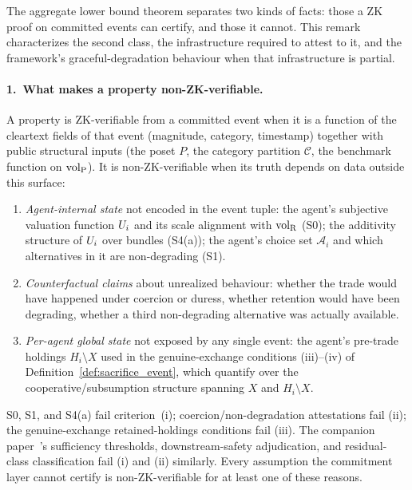 \begin{remark}
\label{rem:external_attestation}
The aggregate lower bound theorem separates two kinds of facts:
those a ZK proof on committed events can certify, and those it
cannot.  This remark characterizes the second class, the
infrastructure required to attest to it, and the framework's
graceful-degradation behaviour when that infrastructure is
partial.

\paragraph{1.~What makes a property non-ZK-verifiable.}
A property is ZK-verifiable from a committed event when it is
a function of the cleartext fields of that event (magnitude,
category, timestamp) together with public structural inputs
(the poset $P$, the category partition $\mathcal{C}$, the
benchmark function on ${\operatorname{vol}_{\mathrm{P}}}$).  It is non-ZK-verifiable when
its truth depends on data outside this surface:
\begin{enumerate}
\item[(i)] \emph{Agent-internal state} not encoded in the event
  tuple: the agent's subjective valuation function $U_i$ and
  its scale alignment with ${\operatorname{vol}_{\mathrm{R}}}$ (S0); the additivity
  structure of $U_i$ over bundles (S4(a)); the agent's choice
  set $\mathcal{A}_i$ and which alternatives in it are
  non-degrading (S1).
\item[(ii)] \emph{Counterfactual claims} about unrealized
  behaviour: whether the trade would have happened under
  coercion or duress, whether retention would have been
  degrading, whether a third non-degrading alternative was
  actually available.
\item[(iii)] \emph{Per-agent global state} not exposed by
  any single event: the agent's pre-trade holdings
  $H_i \setminus X$ used in the genuine-exchange conditions
  (iii)--(iv) of Definition~\ref{def:sacrifice_event}, which
  quantify over the cooperative/subsumption structure spanning
  $X$ and $H_i \setminus X$.
\end{enumerate}
S0, S1, and S4(a) fail criterion~(i); coercion/non-degradation
attestations fail (ii); the genuine-exchange retained-holdings
conditions fail (iii).  The companion
paper~\citep[Need~Sufficiency]{lasser2026paper8b}'s
sufficiency thresholds, downstream-safety adjudication, and
residual-class classification fail (i) and (ii) similarly.
Every assumption the commitment layer cannot certify is
non-ZK-verifiable for at least one of these reasons.


\end{remark}
